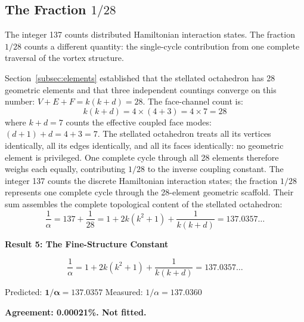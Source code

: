 \documentclass[aps,prd,preprint,superscriptaddress,showpacs,preprintnumbers,amsmath,amssymb,nofootinbib]{revtex4-2}
\begin{document}
\subsection{The Fraction $1/28$}
\label{subsec:fraction}

The integer 137 counts distributed Hamiltonian interaction states. The fraction $1/28$ counts a different quantity: the single-cycle contribution from one complete traversal of the vortex structure.

Section~\ref{subsec:elements} established that the stellated octahedron has 28 geometric elements and that three independent countings converge on this number: $V + E + F = k(k+d) = 28$. The face-channel count is:
\begin{equation}
k(k + d) = 4 \times (4 + 3) = 4 \times 7 = 28
\end{equation}
where $k + d = 7$ counts the effective coupled face modes: $(d+1) + d = 4 + 3 = 7$. The stellated octahedron treats all its vertices identically, all its edges identically, and all its faces identically: no geometric element is privileged. One complete cycle through all 28 elements therefore weighs each equally, contributing $1/28$ to the inverse coupling constant. The integer 137 counts the discrete Hamiltonian interaction states; the fraction $1/28$ represents one complete cycle through the 28-element geometric scaffold. Their sum assembles the complete topological content of the stellated octahedron:
\begin{equation}
\frac{1}{\alpha} = 137 + \frac{1}{28} = 1 + 2k(k^2 + 1) + \frac{1}{k(k+d)} = 137.0357\ldots
\label{eq:alpha-full}
\end{equation}

\vspace{1.5em}
\noindent
\colorbox{resultgreen}{\parbox{\dimexpr\textwidth-2\fboxsep\relax}{%
\vspace{0.8em}
\centering
\textbf{\large Result 5: The Fine-Structure Constant}

\vspace{0.5em}
\boldmath
\begin{equation}
\frac{1}{\alpha} = 1 + 2k(k^2 + 1) + \frac{1}{k(k+d)} = 137.0357\ldots
\end{equation}
\unboldmath

\vspace{0.3em}
Predicted: $\bm{1/\alpha = 137.0357}$ \quad Measured: $1/\alpha = 137.0360$~\cite{codata2022}

\textbf{Agreement: 0.00021\%. Not fitted.}
\vspace{0.5em}
}}
\vspace{1cm}
\end{document}
